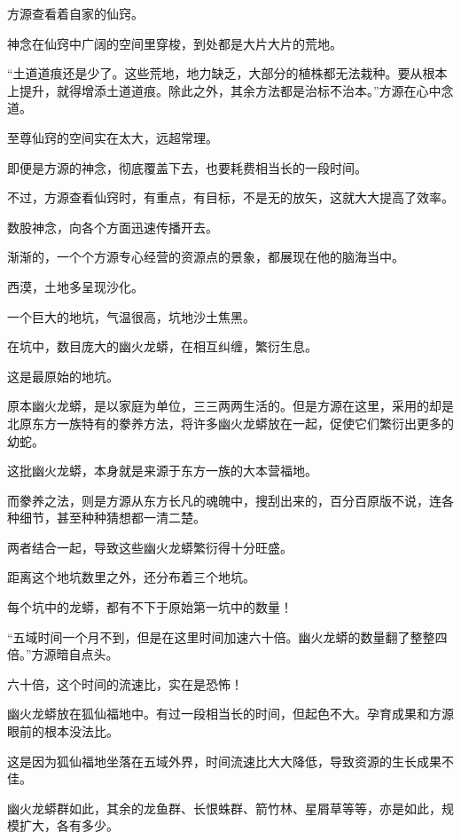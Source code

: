 
\begin{this_body}



方源查看着自家的仙窍。

神念在仙窍中广阔的空间里穿梭，到处都是大片大片的荒地。

“土道道痕还是少了。这些荒地，地力缺乏，大部分的植株都无法栽种。要从根本上提升，就得增添土道道痕。除此之外，其余方法都是治标不治本。”方源在心中念道。

至尊仙窍的空间实在太大，远超常理。

即便是方源的神念，彻底覆盖下去，也要耗费相当长的一段时间。

不过，方源查看仙窍时，有重点，有目标，不是无的放矢，这就大大提高了效率。

数股神念，向各个方面迅速传播开去。

渐渐的，一个个方源专心经营的资源点的景象，都展现在他的脑海当中。

西漠，土地多呈现沙化。

一个巨大的地坑，气温很高，坑地沙土焦黑。

在坑中，数目庞大的幽火龙蟒，在相互纠缠，繁衍生息。

这是最原始的地坑。

原本幽火龙蟒，是以家庭为单位，三三两两生活的。但是方源在这里，采用的却是北原东方一族特有的豢养方法，将许多幽火龙蟒放在一起，促使它们繁衍出更多的幼蛇。

这批幽火龙蟒，本身就是来源于东方一族的大本营福地。

而豢养之法，则是方源从东方长凡的魂魄中，搜刮出来的，百分百原版不说，连各种细节，甚至种种猜想都一清二楚。

两者结合一起，导致这些幽火龙蟒繁衍得十分旺盛。

距离这个地坑数里之外，还分布着三个地坑。

每个坑中的龙蟒，都有不下于原始第一坑中的数量！

“五域时间一个月不到，但是在这里时间加速六十倍。幽火龙蟒的数量翻了整整四倍。”方源暗自点头。

六十倍，这个时间的流速比，实在是恐怖！

幽火龙蟒放在狐仙福地中。有过一段相当长的时间，但起色不大。孕育成果和方源眼前的根本没法比。

这是因为狐仙福地坐落在五域外界，时间流速比大大降低，导致资源的生长成果不佳。

幽火龙蟒群如此，其余的龙鱼群、长恨蛛群、箭竹林、星屑草等等，亦是如此，规模扩大，各有多少。


\end{this_body}
